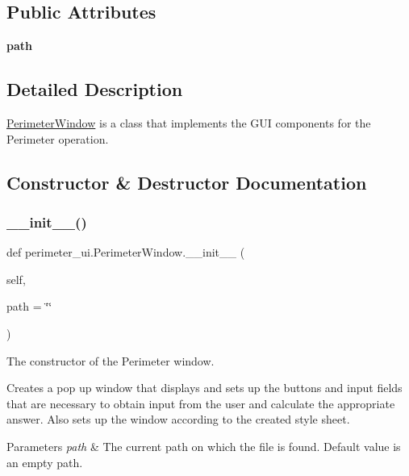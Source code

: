 \subsection*{Public Attributes}
\begin{DoxyCompactItemize}
\item 
\mbox{\label{classperimeter__ui_1_1_perimeter_window_aa5f7496d431ceed317466669c3051272}} 
{\bfseries path}
\end{DoxyCompactItemize}


\subsection{Detailed Description}
\hyperlink{classperimeter__ui_1_1_perimeter_window}{Perimeter\+Window} is a class that implements the G\+UI components for the Perimeter operation. 

\subsection{Constructor \& Destructor Documentation}
\mbox{\label{classperimeter__ui_1_1_perimeter_window_aa763b2caa5f3425d4666e237a58c1dc3}} 
\subsubsection{\texorpdfstring{\+\_\+\+\_\+init\+\_\+\+\_\+()}{\_\_init\_\_()}}
{\footnotesize\ttfamily def perimeter\+\_\+ui.\+Perimeter\+Window.\+\_\+\+\_\+init\+\_\+\+\_\+ (\begin{DoxyParamCaption}\item[{}]{self,  }\item[{}]{path = {\ttfamily \char`\"{}\char`\"{}} }\end{DoxyParamCaption})}



The constructor of the Perimeter window. 

Creates a pop up window that displays and sets up the buttons and input fields that are necessary to obtain input from the user and calculate the appropriate answer. Also sets up the window according to the created style sheet. 
\begin{DoxyParams}{Parameters}
{\em path} & The current path on which the file is found. Default value is an empty path. \\
\hline
\end{DoxyParams}


